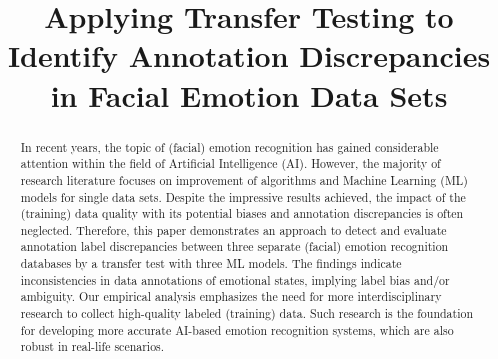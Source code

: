 \documentclass[a4paper, conference]{IEEEtran}
\begin{document}
\title{Applying Transfer Testing to Identify Annotation Discrepancies in Facial Emotion Data Sets\\}
%

\maketitle

\begin{abstract}
In recent years, the topic of (facial) emotion recognition has gained considerable attention within the field of Artificial Intelligence (AI). 
However, the majority of research literature focuses on improvement of algorithms and Machine Learning (ML) models for single data sets. Despite 
the impressive results achieved, the impact of the (training) data quality with its potential biases and annotation discrepancies is often neglected. Therefore, this paper demonstrates an approach to detect and evaluate annotation label discrepancies between three separate (facial) emotion 
recognition databases by a transfer test with three ML models. The findings indicate inconsistencies in data annotations of emotional states, implying label bias and/or ambiguity. Our empirical 
analysis emphasizes the need for more interdisciplinary research to collect high-quality labeled (training) data. Such research is the foundation for 
developing more accurate AI-based emotion recognition systems, which are also robust in real-life scenarios.\newline
\end{abstract}
\end{document}
